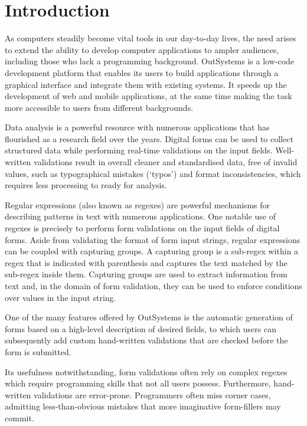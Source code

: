 \chapter{Introduction}

As computers steadily become vital tools in our day-to-day lives, the need arises to extend the ability to develop computer applications to ampler audiences, including those who lack a programming background.
OutSystems\footnotemark{} is a low-code development platform that enables its users to build applications through a graphical interface and integrate them with existing systems. It speeds up the development of web and mobile applications, at the same time making the task more accessible to users from different backgrounds. 

Data analysis is a powerful resource with numerous applications that has flourished as a research field over the years.
Digital forms can be used to collect structured data while performing real-time validations on the input fields. Well-written validations result in overall cleaner and standardised data, free of invalid values, such as typographical mistakes (`typos') and format inconsistencies, which requires less processing to ready for analysis.

Regular expressions (also known as regexes) are powerful mechanisms for describing patterns in text with numerous applications.
One notable use of regexes is precisely to perform form validations on the input fields of digital forms.
%
Aside from validating the format of form input strings, regular expressions can be coupled with capturing groups.
%
A capturing group is a sub-regex within a regex that is indicated with parenthesis and 
captures the text matched by the sub-regex inside them.
Capturing groups are used to extract information from text and, in the domain of form validation, they can be used to enforce conditions over values in the input string.

One of the many features offered by OutSystems is the automatic generation of forms based on a high-level description of desired fields, to which users can subsequently add custom hand-written validations that are checked before the form is submitted.

Its usefulness notwithstanding, form validations often rely on complex regexes which require programming skills that not all users possess.
Furthermore, hand-written validations are error-prone. Programmers often miss corner cases, admitting less-than-obvious mistakes that more imaginative form-fillers may commit.

